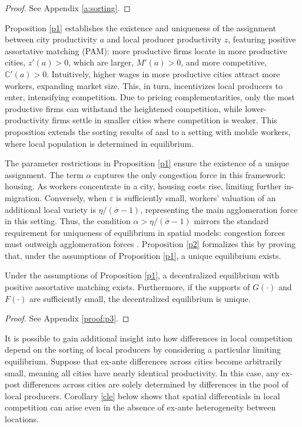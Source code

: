 \begin{proof}
	See Appendix \ref{a:sorting}.
\end{proof}

Proposition \ref{p1} establishes the existence and uniqueness of the assignment between city productivity $a$ and local producer productivity $z$, featuring positive assortative matching (PAM): more productive firms locate in more productive cities, $z'(a) > 0$, which are larger, $M'(a) > 0$, and more competitive, $\mathbb{C}'(a) > 0$. Intuitively, higher wages in more productive cities attract more workers, expanding market size. This, in turn, incentivizes local producers to enter, intensifying competition. Due to pricing complementarities, only the most productive firms can withstand the heightened competition, while lower-productivity firms settle in smaller cities where competition is weaker. This proposition extends the sorting results of \textcite{Nocke06} and \textcite{Matsuyama&Ushev22} to a setting with mobile workers, where local population is determined in equilibrium.

The parameter restrictions in Proposition \ref{p1} ensure the existence of a unique assignment. The term $\alpha$ captures the only congestion force in this framework: housing. As workers concentrate in a city, housing costs rise, limiting further in-migration. Conversely, when $\varepsilon$ is sufficiently small, workers’ valuation of an additional local variety is $\eta/(\overline{\sigma} -1)$, representing the main agglomeration force in this setting. Thus, the condition $\alpha > \eta/(\overline{\sigma} -1)$ mirrors the standard requirement for uniqueness of equilibrium in spatial models: congestion forces must outweigh agglomeration forces \parencite{Redding&RossiHansberg17}. Proposition \ref{p2} formalizes this by proving that, under the assumptions of Proposition \ref{p1}, a unique equilibrium exists.

\begin{prop}\label{p2}
    Under the assumptions of Proposition \ref{p1}, a decentralized equilibrium with positive assortative matching exists. Furthermore, if the supports of $G(\cdot)$ and $F(\cdot)$ are sufficiently small, the decentralized equilibrium is unique.
\end{prop}

\begin{proof}
	See Appendix \ref{proof:p3}.
\end{proof}

It is possible to gain additional insight into how differences in local competition depend on the sorting of local producers by considering a particular limiting equilibrium. Suppose that ex-ante differences across cities become arbitrarily small, meaning all cities have nearly identical productivity. In this case, any ex-post differences across cities are solely determined by differences in the pool of local producers. Corollary \ref{cle} below shows that spatial differentials in local competition can arise even in the absence of ex-ante heterogeneity between locations.

